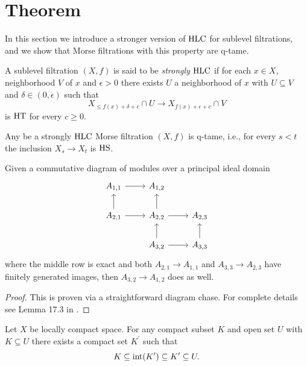 
\section{Theorem} \label{sec:theorem}

In this section we introduce a stronger version of $\mathrm{HLC}$ for sublevel filtrations, and we show that Morse filtrations with this property are q-tame.

\begin{defi}
	A sublevel filtration $(X,f)$ is said to be \textit{strongly} $\mathrm{HLC}$ if for each $x \in X$, neighborhood $V$ of $x$ and $\epsilon > 0$ there exists $U$ a neighborhood of $x$ with $U \subseteq V$ and $\delta \in (0, \epsilon)$ such that
	\begin{equation*}
	X_{\leq f(x) + \delta + c} \cap U \to X_{f(x) + \epsilon + c} \cap V
	\end{equation*}
	is $\mathrm{HT}$ for every $c \geq 0$.
\end{defi}

\begin{thm} \label{t:strong local connectenss implies q-tameness}
	Any be a strongly $\mathrm{HLC}$ Morse filtration $(X,f)$ is q-tame, i.e., for every $s < t$ the inclusion $X_s \to X_t$ is $\mathrm{HS}$.
\end{thm}

\begin{lem} \label{l:commutative algebra}
	Given a commutative diagram of modules over a principal ideal domain
	\begin{equation*}
	\begin{tikzcd}
	A_{1,1} \arrow[r] & A_{1,2} & \\
	A_{2,1} \arrow[r] \arrow[u] & A_{2,2} \arrow[r] \arrow[u] & A_{2,3} \\
	& A_{3,2} \arrow[r] \arrow[u] & A_{3,3} \arrow[u]
	\end{tikzcd}
	\end{equation*}
	where the middle row is exact and both $A_{2,1} \to A_{1,1}$ and $A_{3,3} \to A_{2,3}$ have finitely generated images, then $A_{3,2} \to A_{1,2}$ does as well.
\end{lem}

\begin{proof}
	This is proven via a straightforward diagram chase. For complete details see Lemma 17.3 in \cite{Bredon.1968}.
\end{proof}

\begin{lem} \label{l:neighborhood third}
	Let $X$ be locally compact space.
	For any compact subset $K$ and open set $U$ with $K \subseteq U$ there exists a compact set $K^\prime$ such that
	\begin{equation*}
	K \subseteq \operatorname{int}(K^\prime) \subseteq K^\prime \subseteq U.
	\end{equation*}
\end{lem}

